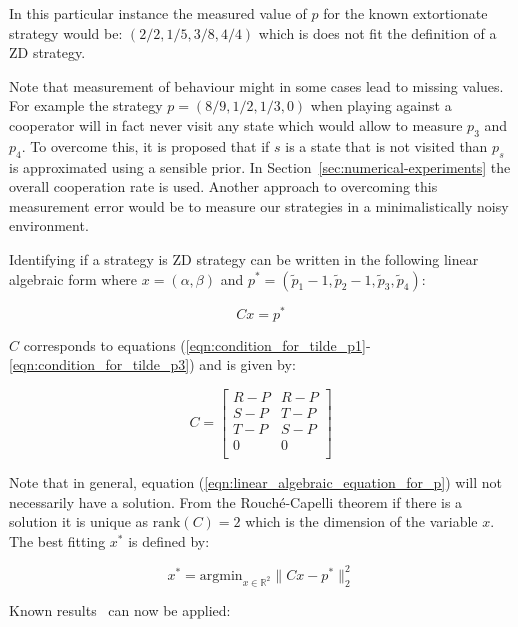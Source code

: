 \documentclass[a4paper]{article}
\begin{document}
In this particular instance the measured value of \(p\) for the known
extortionate strategy would be: \((2/2, 1/5, 3/8, 4/4)\) which is does not fit
the definition of a ZD strategy.

Note that measurement of behaviour might in some cases lead to missing values.
For example the strategy \(p=(8 / 9, 1 / 2, 1 / 3, 0)\) when playing against a
cooperator will in fact never visit any state which would allow to measure
\(p_3\) and \(p_4\). To overcome this, it is proposed that if \(s\) is a state
that is not visited than \(p_s\) is approximated using a sensible prior. In
Section~\ref{sec:numerical-experiments} the overall cooperation rate is used.
Another approach to overcoming this measurement error would be to measure our
strategies in a minimalistically noisy environment.

Identifying if a strategy is ZD strategy can be written in the following linear
algebraic form where \(x=(\alpha, \beta)\) and \(p^*=(\tilde p_1 - 1, \tilde p_2
- 1, \tilde p_3, \tilde p_4)\):

\begin{equation}\label{eqn:linear_algebraic_equation_for_p}
    Cx= p^*
\end{equation}

\(C\) corresponds to equations
(\ref{eqn:condition_for_tilde_p1}-\ref{eqn:condition_for_tilde_p3}) and is
given by:

\begin{equation}\label{eqn:definition_of_C}
    C =
    \begin{bmatrix}
        R - P & R- P \\
        S - P & T- P \\
        T - P & S- P \\
        0     & 0 \\
    \end{bmatrix}
\end{equation}

Note that in general, equation (\ref{eqn:linear_algebraic_equation_for_p}) will
not necessarily have a solution. From the Rouch\'{e}-Capelli theorem if there is
a solution it is unique as \(\text{rank}(C)=2\) which is the dimension of the
variable \(x\). The best fitting \(x^*\) is defined by:

\begin{equation}\label{eqn:x_star}
    x^* = \text{argmin}_{x\in\mathbb{R}^2}\|C x- p^*\|_2^2
\end{equation}

Known results~\cite{kutner2004applied, rao1973linear, wakefield2013bayesian} can
now be applied:
\end{document}
